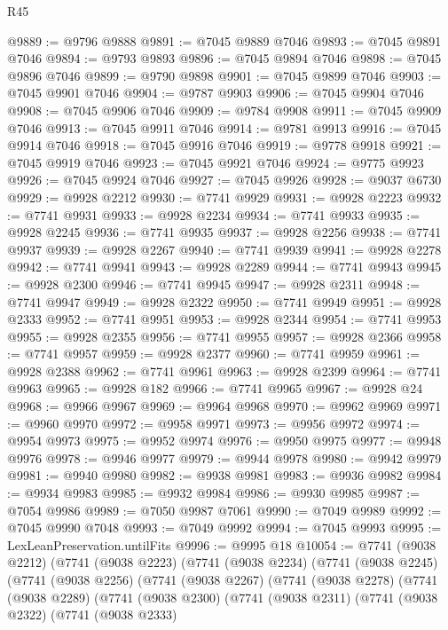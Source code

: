 \begin{lexlean}{R45}
\begin{coremodule}
{@9889 := @9796 @9888
@9891 := @7045 @9889 @7046
@9893 := @7045 @9891 @7046
@9894 := @9793 @9893
@9896 := @7045 @9894 @7046
@9898 := @7045 @9896 @7046
@9899 := @9790 @9898
@9901 := @7045 @9899 @7046
@9903 := @7045 @9901 @7046
@9904 := @9787 @9903
@9906 := @7045 @9904 @7046
@9908 := @7045 @9906 @7046
@9909 := @9784 @9908
@9911 := @7045 @9909 @7046
@9913 := @7045 @9911 @7046
@9914 := @9781 @9913
@9916 := @7045 @9914 @7046
@9918 := @7045 @9916 @7046
@9919 := @9778 @9918
@9921 := @7045 @9919 @7046
@9923 := @7045 @9921 @7046
@9924 := @9775 @9923
@9926 := @7045 @9924 @7046
@9927 := @7045 @9926
@9928 := @9037 @6730
@9929 := @9928 @2212
@9930 := @7741 @9929
@9931 := @9928 @2223
@9932 := @7741 @9931
@9933 := @9928 @2234
@9934 := @7741 @9933
@9935 := @9928 @2245
@9936 := @7741 @9935
@9937 := @9928 @2256
@9938 := @7741 @9937
@9939 := @9928 @2267
@9940 := @7741 @9939
@9941 := @9928 @2278
@9942 := @7741 @9941
@9943 := @9928 @2289
@9944 := @7741 @9943
@9945 := @9928 @2300
@9946 := @7741 @9945
@9947 := @9928 @2311
@9948 := @7741 @9947
@9949 := @9928 @2322
@9950 := @7741 @9949
@9951 := @9928 @2333
@9952 := @7741 @9951
@9953 := @9928 @2344
@9954 := @7741 @9953
@9955 := @9928 @2355
@9956 := @7741 @9955
@9957 := @9928 @2366
@9958 := @7741 @9957
@9959 := @9928 @2377
@9960 := @7741 @9959
@9961 := @9928 @2388
@9962 := @7741 @9961
@9963 := @9928 @2399
@9964 := @7741 @9963
@9965 := @9928 @182
@9966 := @7741 @9965
@9967 := @9928 @24
@9968 := @9966 @9967
@9969 := @9964 @9968
@9970 := @9962 @9969
@9971 := @9960 @9970
@9972 := @9958 @9971
@9973 := @9956 @9972
@9974 := @9954 @9973
@9975 := @9952 @9974
@9976 := @9950 @9975
@9977 := @9948 @9976
@9978 := @9946 @9977
@9979 := @9944 @9978
@9980 := @9942 @9979
@9981 := @9940 @9980
@9982 := @9938 @9981
@9983 := @9936 @9982
@9984 := @9934 @9983
@9985 := @9932 @9984
@9986 := @9930 @9985
@9987 := @7054 @9986
@9989 := @7050 @9987 @7061
@9990 := @7049 @9989
@9992 := @7045 @9990 @7048
@9993 := @7049 @9992
@9994 := @7045 @9993
@9995 := LexLeanPreservation.untilFits
@9996 := @9995 @18
@10054 := @7741
    (@9038 @2212)
    (@7741
      (@9038 @2223)
      (@7741
        (@9038 @2234)
        (@7741
          (@9038 @2245)
          (@7741
            (@9038 @2256)
            (@7741
              (@9038 @2267)
              (@7741
                (@9038 @2278)
                (@7741
                  (@9038 @2289)
                  (@7741
                    (@9038 @2300)
                    (@7741
                      (@9038 @2311)
                      (@7741
                        (@9038 @2322)
                        (@7741
                          (@9038 @2333)
}
\end{coremodule}
\end{lexlean}
